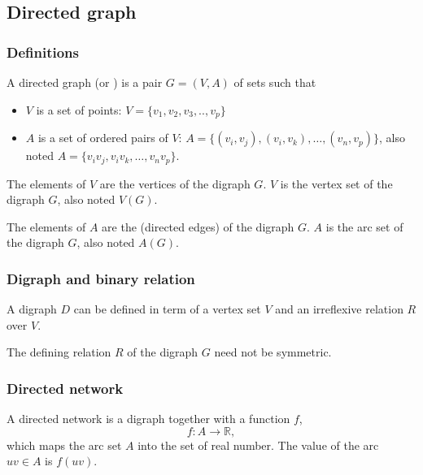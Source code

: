 \documentclass[aspectratio=169]{beamer}
\begin{document}
\subsection{Directed graph}
\begin{frame} \frametitle{Definitions} 
\begin{definition}[{Digraph}]
A directed graph (or ) is a pair $G=(V,A)$ of sets such that
\begin{itemize}
\item $V$ is a set of points:  $V=\{v_1,v_2,v_3,..,v_p\}$
\item $A$ is a set of ordered pairs of $V$: $A=\{(v_i,v_j),(v_i,v_k),\dots,(v_n,v_p)\}$, also noted $A=\{v_iv_j,v_iv_k,\dots,v_nv_p\}$.
\end{itemize}
\end{definition}
\begin{definition}[{Vertex}]
The elements of $V$ are the vertices of the digraph $G$.
$V$ is the vertex set of the digraph $G$, also noted $V(G)$.
\end{definition}
\begin{definition}[{Arc}]
The elements of $A$ are the  (directed edges) of the digraph $G$.
$A$ is the arc set of the digraph $G$, also noted $A(G)$.
\end{definition}
\end{frame}



\begin{frame}\frametitle{Digraph and binary relation}
A digraph $D$ can be defined in term of a vertex set $V$ and an irreflexive relation $R$ over $V$.

The defining relation $R$ of the digraph $G$ need not be symmetric.
\end{frame}


\begin{frame}\frametitle{Directed network}
\begin{definition}
A directed network is a digraph together with a function $f$,
\[
f: A \rightarrow \mathbb{R},
\]
which maps the arc set $A$ into the set of real number. 
The value of the arc $uv \in A$ is $f(uv)$.
\end{definition}
\end{frame}



\end{document}
